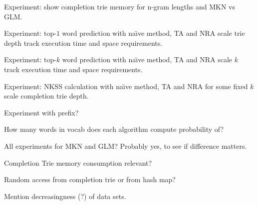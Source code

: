 \begin{draft}
Experiment: show completion trie memory for n-gram lengths and MKN vs GLM.

Experiment: top-$1$ word prediction with na\"{\i}ve method, TA and NRA scale
trie depth track execution time and space requirements.

Experiment: top-$k$ word prediction with na\"{\i}ve method, TA and NRA scale
$k$ track execution time and space requirements.

Experiment: NKSS calculation with na\"{\i}ve method, TA and NRA for some fixed
$k$ scale completion trie depth.

Experiment with prefix?

How many words in vocab does each algorithm compute probability of?

All experiments for MKN and GLM?
Probably yes, to see if difference matters.

Completion Trie memory consumption relevant?

Random access from completion trie or from hash map?

Mention decreasingness (?) of data sets.
\end{draft}

